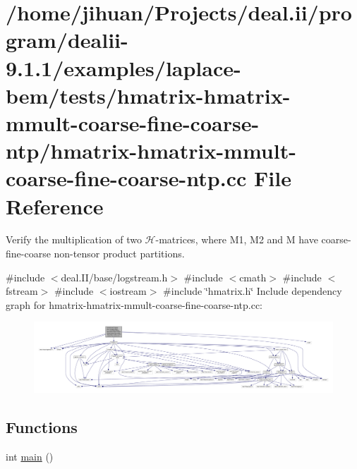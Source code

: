 \hypertarget{hmatrix-hmatrix-mmult-coarse-fine-coarse-ntp_8cc}{}\section{/home/jihuan/\+Projects/deal.ii/program/dealii-\/9.1.1/examples/laplace-\/bem/tests/hmatrix-\/hmatrix-\/mmult-\/coarse-\/fine-\/coarse-\/ntp/hmatrix-\/hmatrix-\/mmult-\/coarse-\/fine-\/coarse-\/ntp.cc File Reference}
\label{hmatrix-hmatrix-mmult-coarse-fine-coarse-ntp_8cc}


Verify the multiplication of two $\mathcal{H}$-\/matrices, where M1, M2 and M have coarse-\/fine-\/coarse non-\/tensor product partitions.  


{\ttfamily \#include $<$deal.\+I\+I/base/logstream.\+h$>$}\newline
{\ttfamily \#include $<$cmath$>$}\newline
{\ttfamily \#include $<$fstream$>$}\newline
{\ttfamily \#include $<$iostream$>$}\newline
{\ttfamily \#include \char`\"{}hmatrix.\+h\char`\"{}}\newline
Include dependency graph for hmatrix-\/hmatrix-\/mmult-\/coarse-\/fine-\/coarse-\/ntp.cc\+:\nopagebreak
\begin{figure}[H]
\begin{center}
\leavevmode
\includegraphics[width=350pt]{hmatrix-hmatrix-mmult-coarse-fine-coarse-ntp_8cc__incl}
\end{center}
\end{figure}
\subsection*{Functions}
\begin{DoxyCompactItemize}
\item 
int \hyperlink{hmatrix-hmatrix-mmult-coarse-fine-coarse-ntp_8cc_ae66f6b31b5ad750f1fe042a706a4e3d4}{main} ()
\end{DoxyCompactItemize}


